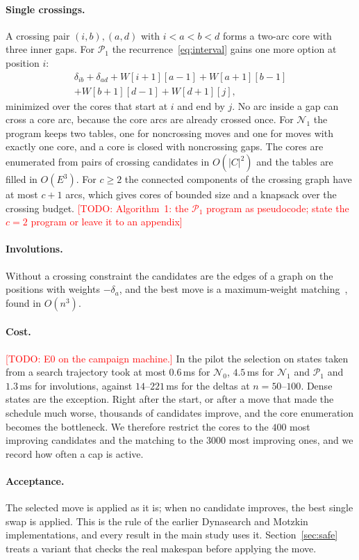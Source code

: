 \documentclass[10pt,twocolumn]{article}
\newcommand{\todo}[1]{\textcolor{red}{[TODO: #1]}}
\newcommand{\N}{\mathcal{N}}
\newcommand{\Pa}{\mathcal{P}}
\begin{document}
\paragraph{Single crossings.} A crossing pair $(i,b),(a,d)$ with
$i<a<b<d$ forms a two-arc core with three inner gaps. For $\Pa_1$ the
recurrence~\eqref{eq:interval} gains one more option at position $i$:
\begin{multline}
\delta_{ib}+\delta_{ad}+W[i{+}1][a{-}1]+W[a{+}1][b{-}1]\\
+W[b{+}1][d{-}1]+W[d{+}1][j],
\end{multline}
minimized over the cores that start at $i$ and end by $j$. No arc inside
a gap can cross a core arc, because the core arcs are already crossed
once. For $\N_1$ the program keeps two tables, one for noncrossing moves
and one for moves with exactly one core, and a core is closed with
noncrossing gaps. The cores are enumerated from pairs of crossing
candidates in $O(|C|^2)$ and the tables are filled in $O(E^3)$. For
$c\geq2$ the connected components of the crossing graph have at most
$c+1$ arcs, which gives cores of bounded size and a knapsack over the
crossing budget. \todo{Algorithm~1: the $\Pa_1$ program as pseudocode;
state the $c=2$ program or leave it to an appendix}

\paragraph{Involutions.} Without a crossing constraint the candidates
are the edges of a graph on the positions with weights $-\delta_a$, and
the best move is a maximum-weight matching~\cite{edmonds1965}, found in
$O(n^3)$.

\paragraph{Cost.} \todo{E0 on the campaign machine.} In the pilot the
selection on states taken from a search trajectory took at most
$0.6$\,ms for $\N_0$, $4.5$\,ms for $\N_1$ and $\Pa_1$ and $1.3$\,ms for
involutions, against $14$--$221$\,ms for the deltas at $n=50$--$100$.
Dense states are the exception. Right after the start, or after a move
that made the schedule much worse, thousands of candidates improve, and
the core enumeration becomes the bottleneck. We therefore restrict the
cores to the $400$ most improving candidates and the matching to the
$3000$ most improving ones, and we record how often a cap is active.

\paragraph{Acceptance.} The selected move is applied as it is; when no
candidate improves, the best single swap is applied. This is the rule of
the earlier Dynasearch and Motzkin implementations, and every result in
the main study uses it. Section~\ref{sec:safe} treats a variant that
checks the real makespan before applying the move.
\end{document}
